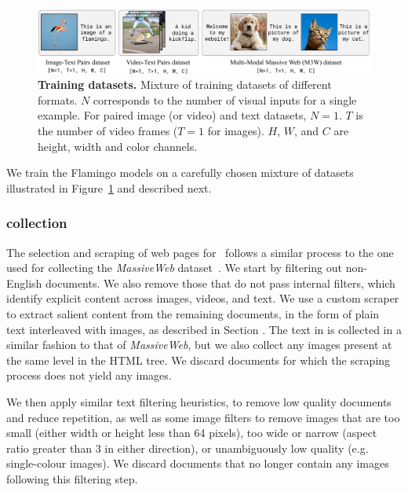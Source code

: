 \begin{figure}[t]
\includegraphics[width=\linewidth]{figures/fig0_data_mixture.pdf}
\centering
\caption{\small \textbf{Training datasets.} Mixture of training datasets of different formats. $N$ corresponds to the number of visual inputs for a single example. For paired image (or video) and text datasets, $N = 1$. $T$ is the number of video frames ($T = 1$ for images). $H$, $W$, and $C$ are height, width and color channels.}
\label{fig:training_data}
\end{figure}

We train the Flamingo models on a carefully chosen mixture of datasets illustrated in Figure~\ref{fig:training_data} and described next.

\label{app:datasets}

\subsubsection{\mmmw{} collection}
\label{app:collection-m3w}

The selection and scraping of web pages for \mmmw~follows a similar process to the one used for collecting the \emph{MassiveWeb} dataset~\citep{gopher}. We start by filtering out non-English documents. 
We also remove those that do not pass internal filters,
which identify explicit content across images, videos, and text. We use a custom scraper to extract salient content from the remaining documents, in the form of plain text interleaved with images, as described in Section .
The text in \mmmw{} is collected in a similar fashion to that of \emph{MassiveWeb},
but we also collect any images present at the same level in the HTML tree. We discard documents for which the scraping process does not yield any images.

We then apply similar text filtering heuristics, to remove low quality documents and reduce repetition, as well as some image filters to remove images that are too small (either width or height less than 64 pixels), too wide or narrow (aspect ratio greater than 3 in either direction), or unambiguously low quality (e.g. single-colour images). We discard documents that no longer contain any images following this filtering step.


